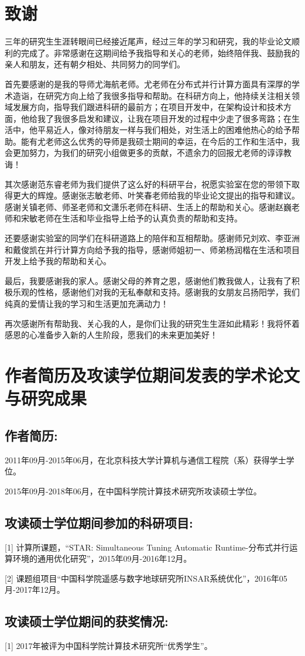 \chapter{致\quad 谢}

三年的研究生生涯转眼间已经接近尾声，经过三年的学习和研究，我的毕业论文顺利的完成了。非常感谢在这期间给予我指导和关心的老师，始终陪伴我、鼓励我的亲人和朋友，还有朝夕相处、共同努力的同学们。

首先要感谢的是我的导师尤海航老师。尤老师在分布式并行计算方面具有深厚的学术造诣，在研究方向上给了我很多指导和帮助。在科研方向上，他持续关注相关领域发展方向，指导我们跟进科研的最前方；在项目开发中，在架构设计和技术方面，他给我了我很多启发和建议，让我在项目开发的过程中少走了很多弯路；在生活中，他平易近人，像对待朋友一样与我们相处，对生活上的困难他热心的给予帮助。能有尤老师这么优秀的导师是我硕士期间的幸运，在今后的工作和生活中，我会更加努力，为我们的研究小组做更多的贡献，不遗余力的回报尤老师的谆谆教诲！

其次感谢范东睿老师为我们提供了这么好的科研平台，祝愿实验室在您的带领下取得更大的辉煌。感谢张志敏老师、叶笑春老师给我的毕业论文提出的指导和建议。感谢关镇老师、师圣老师和文潇乐老师在科研、生活上的帮助和关心。感谢赵巍老师和宋敏老师在生活和毕业指导上给予的认真负责的帮助和支持。

还要感谢实验室的同学们在科研道路上的陪伴和互相帮助。感谢师兄刘欢、李亚洲和戴俊凯在并行计算方向给予我的指导，感谢师姐初一、师弟杨润楷在生活和项目开发上给予我的帮助和关心。

最后，我要感谢我的家人。感谢父母的养育之恩，感谢他们教我做人，让我有了积极乐观的性格，感谢他们对我的无私奉献和支持。感谢我的女朋友吕扬阳学，我们纯真的爱情让我的学习和生活更加充满动力！

再次感谢所有帮助我、关心我的人，是你们让我的研究生生涯如此精彩！我将怀着感恩的心准备步入新的人生阶段，愿我们的未来更加美好！


\chapter{作者简历及攻读学位期间发表的学术论文与研究成果}

\section*{作者简历:}

2011年09月-2015年06月，在北京科技大学计算机与通信工程院（系）获得学士学位。

2015年09月-2018年06月，在中国科学院计算技术研究所攻读硕士学位。

\section*{攻读硕士学位期间参加的科研项目:}

[1] 计算所课题，“STAR: Simultaneous Tuning Automatic Runtime-分布式并行运算环境的通用优化研究”，2015年09月-2016年12月。

[2] 课题组项目“中国科学院遥感与数字地球研究所INSAR系统优化”，2016年05月-2017年12月。

\section*{攻读硕士学位期间的获奖情况:}

[1] 2017年被评为中国科学院计算技术研究所“优秀学生”。

